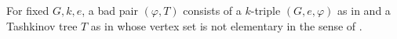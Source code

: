 \begin{definition}
For fixed \(G,k,e\), a bad pair \((\varphi,T)\) consists of a
\(k\)-triple \((G,e,\varphi)\) as in  and a Tashkinov
tree \(T\) as in  whose vertex set
 is not elementary in the sense of
.
\end{definition}
